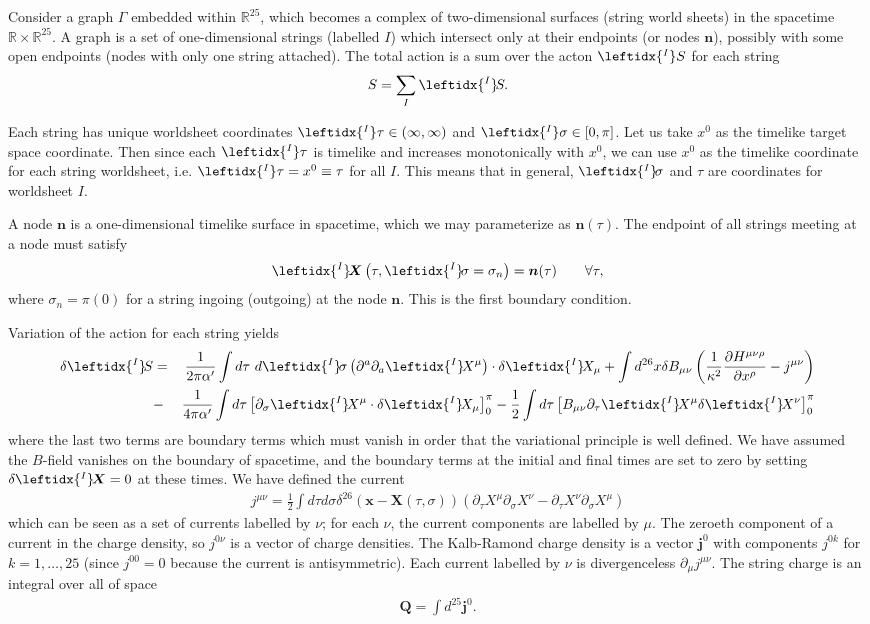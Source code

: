 \documentclass{revtex4}
\newcommand{\be}{\begin{eqnarray}}
\newcommand{\ee}{\end{eqnarray}}
\def\X{\bm{X}}
\def\n{\bm{n}}
\def\lI{\leftidx{^I} \! }
\begin{document}
Consider a graph $\Gamma$ embedded within $\mathbb{R}^{25}$, which becomes a complex of two-dimensional surfaces (string world sheets) in the spacetime $\mathbb{R} \times \mathbb{R}^{25}$. A graph is a set of one-dimensional strings (labelled $I$) which intersect only at their endpoints (or nodes $\n$), possibly with some open endpoints (nodes with only one string attached). The total action is a sum over the acton $ \leftidx{^I}S$ for each string
\be
S = \sum_I \lI S.
\ee

Each string has unique worldsheet coordinates $\leftidx{^I}\tau \in (\infty, \infty)$ and $\leftidx{^I}\sigma \in [0, \pi]$. Let us take $x^0$ as the timelike target space coordinate. Then since each $\leftidx{^I}\tau$ is timelike and increases monotonically with $x^0$, we can use $x^0$ as the timelike coordinate for each string worldsheet, i.e. $\leftidx{^I}\tau = x^0 \equiv \tau$ for all $I$. This means that in general, $\lI \sigma$ and $\tau$ are coordinates for worldsheet $I$.

A node $\n$ is a one-dimensional timelike surface in spacetime, which we may parameterize as $\n(\tau)$. The endpoint of all strings meeting at a node must satisfy
\be
\label{BC1}
\lI \X \left( \tau, \lI \sigma = \sigma_n \right) = \n(\tau) \qquad \forall \tau, 
\ee
where $\sigma_n = \pi (0)$ for a string ingoing (outgoing) at the node $\n$. This is the first boundary condition.

Variation of the action for each string yields
\be
\delta \lI S &=& \frac{1}{2 \pi \alpha' } \int d\tau \ d \lI \sigma \left( \partial^a \partial_a \lI X^\mu \right) \cdot \delta \lI X_\mu
+ \int d^{26} x \delta B_{\mu \nu} \left(\frac{1}{\kappa^2} \frac{\partial H^{\mu \nu \rho}}{\partial x^\rho} - j^{\mu \nu} \right) \nonumber \\
&-& \frac{1}{4 \pi \alpha' } \int d \tau \left[ \partial_{\sigma} \lI X^\mu \cdot \delta \lI X_\mu \right]_{0}^{\pi} - \frac{1}{2} \int d \tau \left[ B_{\mu \nu} \partial_\tau \lI X^\mu \delta \lI X^\nu \right]_0^{\pi}
\label{varS}
\ee
where the last two terms are boundary terms which must vanish in order that the variational principle is well defined. We have assumed the $B$-field vanishes on the boundary of spacetime, and the boundary terms at the initial and final times are set to zero by setting $\delta \lI \X = 0$ at these times. We have defined the current
\be
j^{\mu \nu} = \frac{1}{2} \int d \tau d \sigma \delta^{26}(\bm{x} - \X (\tau, \sigma)) \left( \partial_\tau X^\mu \partial_\sigma X^\nu - 
\partial_\tau X^\nu \partial_\sigma X^\mu \right)
\ee
which can be seen as a set of currents labelled by $\nu$; for each $\nu$, the current components are labelled by $\mu$. The zeroeth component of a current in the charge density, so  $j^{0 \nu}$ is a vector of charge densities. The Kalb-Ramond charge density is a vector $\bm{j}^0$ with components $j^{0 k}$ for $k = 1, \ldots, 25$ (since $j^{00} = 0$ because the current is antisymmetric).
Each current labelled by $\nu$ is divergenceless $\partial_\mu j^{\mu \nu}$. The string charge is an integral over all of space
\be
\bm{Q} = \int d^{25} \bm{j}^0 .
\ee
\end{document}
